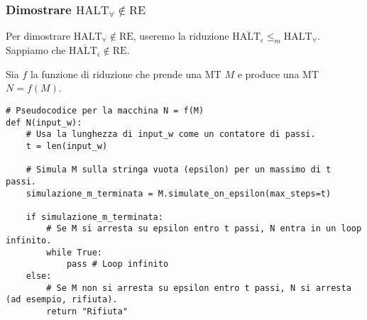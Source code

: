 \documentclass[a4paper, 11pt]{book} %
\theoremstyle{definition}
\begin{document}
\subsubsection{Dimostrare $\text{HALT}_\forall \notin \text{RE}$}
Per dimostrare $\text{HALT}_\forall \notin \text{RE}$, useremo la riduzione $\overline{\text{HALT}_\epsilon} \le_m \text{HALT}_\forall$.
Sappiamo che $\overline{\text{HALT}_\epsilon} \notin \text{RE}$.

Sia $f$ la funzione di riduzione che prende una MT $M$ e produce una MT $N = f(M)$.
\begin{verbatim}
# Pseudocodice per la macchina N = f(M)
def N(input_w):
    # Usa la lunghezza di input_w come un contatore di passi.
    t = len(input_w)
    
    # Simula M sulla stringa vuota (epsilon) per un massimo di t passi.
    simulazione_m_terminata = M.simulate_on_epsilon(max_steps=t)
    
    if simulazione_m_terminata:
        # Se M si arresta su epsilon entro t passi, N entra in un loop infinito.
        while True:
            pass # Loop infinito
    else:
        # Se M non si arresta su epsilon entro t passi, N si arresta (ad esempio, rifiuta).
        return "Rifiuta"
\end{verbatim}
\end{document}

